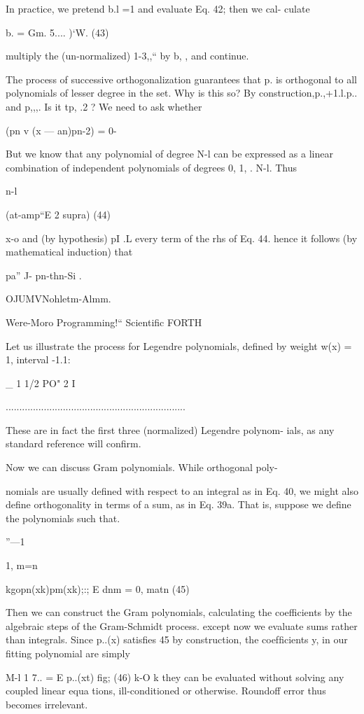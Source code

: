 {{In practice, we pretend b.l =1 and evaluate Eq. 42; then we cal-
culate

b. = Gm. 5.... )‘W. (43)

multiply the (un-normalized) 1-3,,“ by b, , and continue.

The process of successive orthogonalization guarantees that p. is
orthogonal to all polynomials of lesser degree in the set. Why is
this so? By construction,p.,+1.l.p.. and p,,,. Is it tp, .2 ? We
need to ask whether

(pn v (x — an)pn-2) = 0-

But we know that any polynomial of degree N-l can be expressed
as a linear combination of independent polynomials of degrees
0, 1, . N-l. Thus

n-l

(at-amp“E 2 supra) (44)

x-o
and (by hypothesis) pI .L every term of the rhs of Eq. 44. hence
it follows (by mathematical induction) that

pa” J- {pn-thn-Si }.

OJUMVNohletm-Almm.

Were-Moro Programming!“ Scientiﬁc FORTH

Let us illustrate the process for Legendre polynomials, deﬁned
by weight w(x) = 1, interval {-1.1}:

_ 1 1/2
PO" 2 I

..................................................................

These are in fact the first three (normalized) Legendre polynom-
ials, as any standard reference will conﬁrm.

Now we can discuss Gram polynomials. While orthogonal poly-

nomials are usually deﬁned with respect to an integral as in
Eq. 40, we might also deﬁne orthogonality in terms of a sum, as
in Eq. 39a. That is, suppose we deﬁne the polynomials such that.

”—1 { 1, m=n

kgopn(xk)pm(xk);:; E dnm = 0, matn (45)

Then we can construct the Gram polynomials, calculating the
coefficients by the algebraic steps of the Gram-Schmidt process.
except now we evaluate sums rather than integrals. Since p..(x)
satisﬁes 45 by construction, the coefﬁcients y, in our ﬁtting
polynomial are simply

M-l 1
7.. = E p..(xt) fig; (46)
k-O k
they can be evaluated without solving any coupled linear equa
tions, ill-conditioned or otherwise. Roundoff error thus becomes
irrelevant.

}}}
